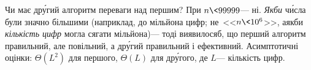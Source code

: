\vspace{0.125\baselineskip plus 1ex}
\myhrulefill
\vspace{0.125\baselineskip plus 1ex}

Чи має др\'{у}гий алгоритм переваги над першим? При ${n{\<}99999}$\nolinebreak[3] --- ні. \emph{Якби} ч\'{и}сла були значно більшими (наприклад, до мільйона цифр; не~<<$n{\<}10^6$>>, а\nolinebreak[2] якби \emph{кількість цифр} могла сягати мільйона)\nolinebreak[3] --- тоді виявилося\nolinebreak[3] б, що перший алгоритм правильний, але повільний, а др\'{у}гий правильний і ефективний. Асимптотичні оцінки: $\Theta(L^2)$ для першого, $\Theta(L)$ для др\'{у}гого, де $L$\nolinebreak[3] --- кількість цифр. %

